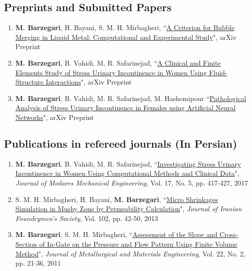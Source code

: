 \documentclass{cv}
\begin{document}
\subsection{Preprints and Submitted Papers}
\begin{enumerate}
\item
\textbf{M. Barzegari}, H. Bayani, S. M. H. Mirbagheri, ``\href{https://arxiv.org/abs/1708.01608}{A Criterion for Bubble Merging in Liquid Metal: Computational and Experimental Study}", arXiv Preprint
\item
\textbf{M. Barzegari}, B. Vahidi, M. R. Safarinejad, ``\href{https://arxiv.org/abs/1708.01601}{A Clinical and Finite Elements Study of Stress Urinary Incontinence in Women Using Fluid-Structure Interactions}", arXiv Preprint
\item
\textbf{M. Barzegari}, B. Vahidi, M. R. Safarinejad, M. Hashemipour ``\href{https://arxiv.org/abs/1803.01843}{Pathological Analysis of Stress Urinary Incontinence in Females using Artificial Neural Networks}", arXiv Preprint
\end{enumerate}

\subsection{Publications in refereed journals (In Persian)}
\begin{enumerate}
\item
\textbf{M. Barzegari}, B. Vahidi, M. R. Safarinejad, ``\href{http://mme-old.modares.ac.ir/article_16771_en.html}{Investigating Stress Urinary Incontinence in Women Using Computational Methods and Clinical Data}", \textit{Journal of Modares Mechanical Engineering}, Vol. 17, No. 5, pp. 417-427, 2017 %
\item
S. M. H. Mirbagheri, H. Bayani, \textbf{M. Barzegari}, ``\href{https://1drv.ms/b/s!Av7P45pSaDtYgUnsN3LHLbiNHomt}{Micro Shrinkages Simulation in Mushy Zone by Permeability Calculation}", \textit{Journal of Iranian Foundrymen's Society}, Vol. 102, pp. 42-50, 2013 %
\item
\textbf{M. Barzegari}, S. M. H. Mirbagheri, ``\href{http://jmme.um.ac.ir/index.php/metallurgical/article/view/10905}{Assessment of the Slope and Cross-Section of In-Gate on the Pressure and Flow Pattern Using Finite Volume Method}", \textit{Journal of Metallurgical and Materials Engineering}, Vol. 22, No. 2, pp. 21-36, 2011 %
\end{enumerate}
\end{document}
